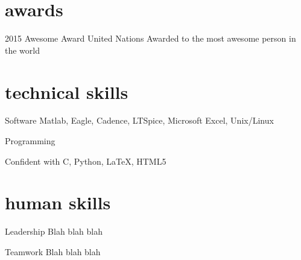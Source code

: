 \documentclass[]{friggeri-cv} %
\begin{document}
\section{awards}

\begin{entrylist}


\entry
{2015}
{Awesome Award}
{United Nations} 
{} 
{Awarded to the most awesome person in the world}



\end{entrylist}


\section{technical skills}

\begin{entrylist}




\entry
{}
{Software}
{}
{}
{
Matlab, Eagle, Cadence, LTSpice, Microsoft Excel, Unix/Linux
}



\entry
{}
{Programming}
{}
{}
{
Confident with C, Python, \LaTeX, HTML5

}




\end{entrylist}




\section{human skills}

\begin{entrylist}




\entry
{}
{Leadership}
{}
{}
{
Blah blah blah
}



\entry
{}
{Teamwork}
{}
{}
{
Blah blah blah
}




\end{entrylist}
\end{document}
